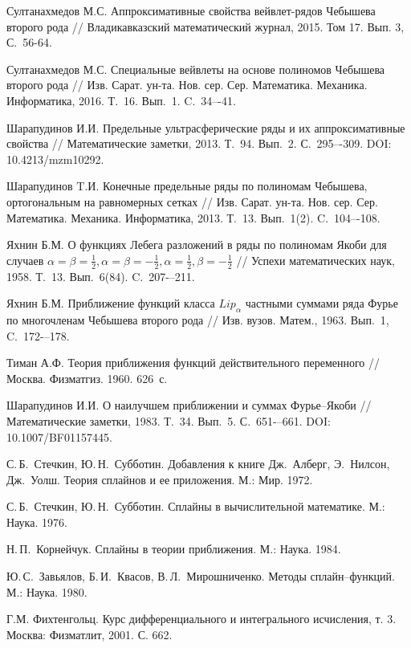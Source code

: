 \begin{thebibliography}{999}
 Султанахмедов М.С. Аппроксимативные свойства вейвлет-рядов Чебышева второго рода  // Владикавказский математический журнал, 2015. Том 17. Вып. 3, С.~56-64.


 Султанахмедов М.С. Специальные вейвлеты на основе полиномов Чебышева второго рода  //
Изв. Сарат. ун-та. Нов. сер. Сер. Математика. Механика. Информатика, 2016. Т.~16. Вып.~1. C.~34–-41.



 Шарапудинов И.И. Предельные ультрасферические ряды и их аппроксимативные свойства // Математические заметки, 2013. Т.~94. Вып.~2. С.~295–-309. DOI: 10.4213/mzm10292.


 Шарапудинов T.И.
Конечные предельные ряды по полиномам Чебышева, ортогональным на равномерных сетках
// Изв. Сарат. ун-та. Нов. сер. Сер. Математика. Механика. Информатика, 2013. Т.~13. Вып.~1(2). C.~104–-108.



 Яхнин Б.М. О функциях Лебега разложений в ряды по полиномам Якоби для случаев $\alpha=\beta=\frac12, \alpha=\beta=-\frac12, \alpha=\frac12, \beta=-\frac12$ // Успехи математических наук, 1958. Т.~13. Вып.~6(84). C.~207-–211.


 Яхнин Б.М. Приближение функций класса $Lip_\alpha$ частными суммами ряда Фурье по многочленам Чебышева второго рода // Изв. вузов. Матем., 1963. Вып.~1, C.~172-–178.


 Тиман А.Ф. Теория приближения функций действительного переменного // Москва. Физматгиз. 1960. 626~с.


 Шарапудинов И.И. О наилучшем приближении и суммах Фурье–Якоби // Математические заметки, 1983. Т.~34. Вып.~5. С.~651-–661. DOI: 10.1007/BF01157445.


  С.\,Б.~Стечкин, Ю.\,Н.~Субботин. Добавления к книге Дж.~Алберг, Э.~Нилсон, Дж.~Уолш.
 Теория сплайнов и ее приложения.  М.: Мир. 1972.


 С.\,Б.~Стечкин, Ю.\,Н.~Субботин.  Сплайны в вычислительной математике. М.:  Наука. 1976.


  Н.\,П.~Корнейчук.  Сплайны в теории приближения. М.:  Наука. 1984.



 Ю.\,С.~Завьялов, Б.\,И.~Квасов, В.\,Л.~Мирошниченко.  Методы сплайн--функций.  М.: Наука. 1980.



Г.М. Фихтенгольц. Курс дифференциального и интегрального исчисления, т. 3. Москва: Физматлит, 2001. С. 662.

\end{thebibliography}
